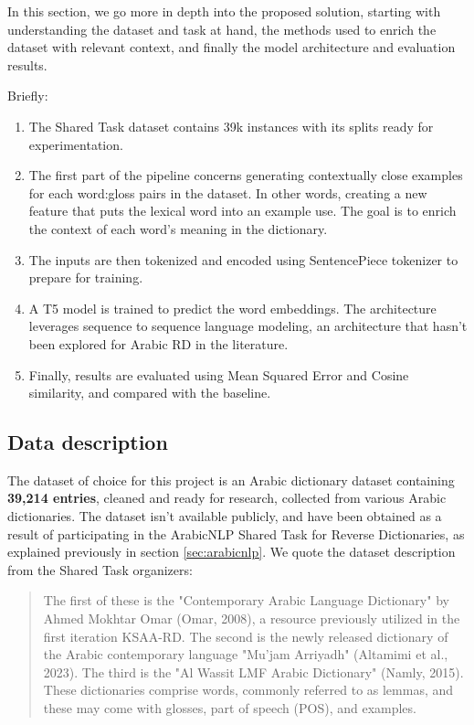\documentclass[12.5pt]{article}
\begin{document}
In this section, we go more in depth into the proposed solution, starting with understanding the dataset and task at hand, the methods used to enrich the dataset with relevant context, and finally the model architecture and evaluation results.

Briefly:
\begin{enumerate}
    \item The Shared Task dataset contains 39k instances with its splits ready for experimentation.
    \item The first part of the pipeline concerns generating contextually close examples for each word:gloss pairs in the dataset. In other words, creating a new feature that puts the lexical word into an example use. The goal is to enrich the context of each word's meaning in the dictionary.
    \item The inputs are then tokenized and encoded using SentencePiece tokenizer to prepare for training.
    \item A T5 model is trained to predict the word embeddings. The architecture leverages sequence to sequence language modeling, an architecture that hasn’t been explored for Arabic RD in the literature.
    \item Finally, results are evaluated using Mean Squared Error and Cosine similarity, and compared with the baseline.
\end{enumerate}

\subsection{Data description}

The dataset of choice for this project is an Arabic dictionary dataset containing \textbf{39,214 entries}, cleaned and ready for research, collected from various Arabic dictionaries. The dataset isn't available publicly, and have been obtained as a result of participating in the ArabicNLP Shared Task for Reverse Dictionaries, as explained previously in section \ref{sec:arabicnlp}. We quote the dataset description from the Shared Task organizers:

\begin{quote}
    The first of these is the "Contemporary Arabic Language Dictionary" by Ahmed Mokhtar Omar (Omar, 2008), a resource previously utilized in the first iteration KSAA-RD. The second is the newly released dictionary of the Arabic contemporary language "Mu'jam Arriyadh" (Altamimi et al., 2023). The third is the "Al Wassit LMF Arabic Dictionary" (Namly, 2015). These dictionaries comprise words, commonly referred to as lemmas, and these may come with glosses, part of speech (POS), and examples.
\end{quote}
\end{document}
